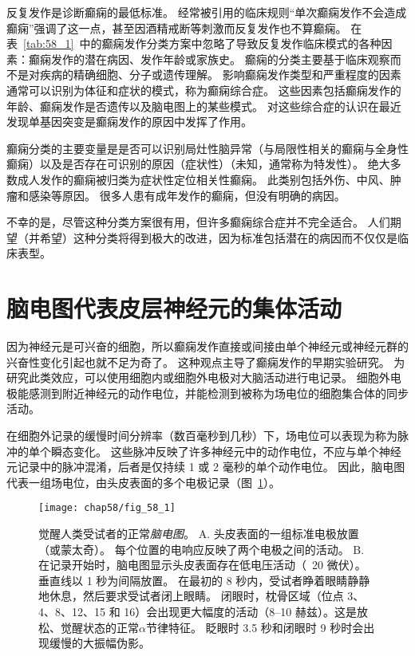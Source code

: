 反复发作是诊断癫痫的最低标准。
经常被引用的临床规则“单次癫痫发作不会造成癫痫”强调了这一点，甚至因酒精戒断等刺激而反复发作也不算癫痫。
在表~\ref{tab:58_1}~中的癫痫发作分类方案中忽略了导致反复发作临床模式的各种因素：癫痫发作的潜在病因、发作年龄或家族史。
癫痫的分类主要基于临床观察而不是对疾病的精确细胞、分子或遗传理解。
影响癫痫发作类型和严重程度的因素通常可以识别为体征和症状的模式，称为癫痫综合症。
这些因素包括癫痫发作的年龄、癫痫发作是否遗传以及脑电图上的某些模式。
对这些综合症的认识在最近发现单基因突变是癫痫发作的原因中发挥了作用。


癫痫分类的主要变量是是否可以识别局灶性脑异常（与局限性相关的癫痫与全身性癫痫）以及是否存在可识别的原因（症状性）（未知，通常称为特发性）。
绝大多数成人发作的癫痫被归类为症状性定位相关性癫痫。
此类别包括外伤、中风、肿瘤和感染等原因。
很多人患有成年发作的癫痫，但没有明确的病因。


不幸的是，尽管这种分类方案很有用，但许多癫痫综合症并不完全适合。
人们期望（并希望）这种分类将得到极大的改进，因为标准包括潜在的病因而不仅仅是临床表型。



\section{脑电图代表皮层神经元的集体活动}

因为神经元是可兴奋的细胞，所以癫痫发作直接或间接由单个神经元或神经元群的兴奋性变化引起也就不足为奇了。
这种观点主导了癫痫发作的早期实验研究。
为研究此类效应，可以使用细胞内或细胞外电极对大脑活动进行电记录。
细胞外电极能感测到附近神经元的动作电位，并能检测到被称为场电位的细胞集合体的同步活动。


在细胞外记录的缓慢时间分辨率（数百毫秒到几秒）下，场电位可以表现为称为脉冲的单个瞬态变化。
这些脉冲反映了许多神经元中的动作电位，不应与单个神经元记录中的脉冲混淆，后者是仅持续 1 或 2 毫秒的单个动作电位。
因此，脑电图代表一组场电位，由头皮表面的多个电极记录（图~\ref{fig:58_1}）。


\begin{figure}[htbp]
	\centering
	\texttt{[image: chap58/fig\_58\_1]}
	\caption{觉醒人类受试者的正常\textit{脑电图}。
		A. 头皮表面的一组标准电极放置（或蒙太奇）。
		每个位置的电响应反映了两个电极之间的活动。
		B. 在记录开始时，脑电图显示头皮表面存在低电压活动（~20 微伏）。
		垂直线以 1 秒为间隔放置。
		在最初的 8 秒内，受试者睁着眼睛静静地休息，然后要求受试者闭上眼睛。
		闭眼时，枕骨区域（位点 3、4、8、12、15 和 16）会出现更大幅度的活动（8–10 赫兹）。这是放松、觉醒状态的正常$ \alpha $节律特征。
		眨眼时 3.5 秒和闭眼时 9 秒时会出现缓慢的大振幅伪影。}
	\label{fig:58_1}
\end{figure}



